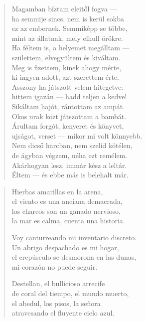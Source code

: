 \documentclass[11pt]{book}
\newcommand*{\centeredornament}{\centerline{\pgfornament[width=6cm]{88}}}
\begin{document}
\begin{verse}
  Magamban bíztam eleitől fogva --- \\
  ha semmije sincs, nem is kerül sokba \\
  ez az embernek. Semmiképp se többe, \\
  mint az állatnak, mely elhull örökre. \\
  Ha féltem is, a helyemet megálltam --- \\
  születtem, elvegyültem és kiváltam. \\
  Meg is fizettem, kinek ahogy mérte, \\
  ki ingyen adott, azt szerettem érte. \\
  Asszony ha játszott velem hitegetve: \\
  hittem igazán --- hadd teljen a kedve! \\
  Sikáltam hajót, rántottam az ampát. \\
  Okos urak közt játszottam a bambát. \\
  Árultam forgót, kenyeret és könyvet, \\
  ujságot, verset --- mikor mi volt könnyebb. \\
  Nem dicső harcban, nem szelíd kötélen, \\
  de ágyban végzem, néha ezt remélem. \\
  Akárhogyan lesz, immár kész a leltár. \\
  Éltem --- és ebbe más is belehalt már.
\end{verse}

\newpage

\vspace*{-15mm}
\centeredornament



\begin{verse}
  Hierbas amarillas en la arena, \\
  el viento es una anciana demacrada, \\
  los charcos son un ganado nervioso, \\
  la mar es calma, cuenta una historia.

  Voy canturreando mi inventario discreto. \\
  Un abrigo despachado es mi hogar, \\
  el crepúsculo se desmorona en las dunas, \\
  mi corazón no puede seguir.

  Destellan, el bullicioso arrecife \\
  de coral del tiempo, el mundo muerto, \\
  el abedul, los pisos, la señora \\
  atravesando el fluyente cielo azul.
\end{verse}
\end{document}
